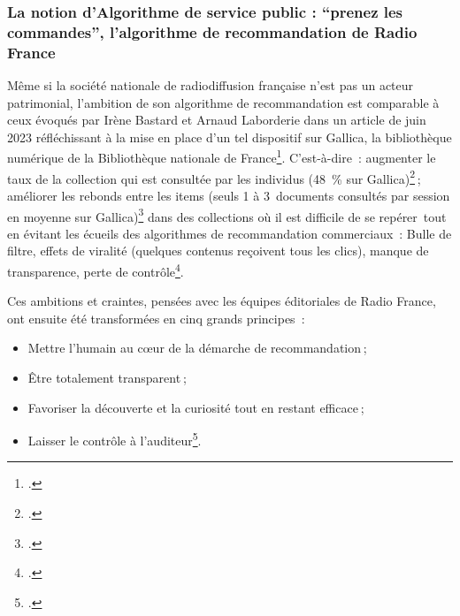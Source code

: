 \subsubsection{La notion d'Algorithme de service public : \enquote{prenez les commandes}, l'algorithme de recommandation de Radio France}

Même si la société nationale de radiodiffusion française n’est pas un acteur patrimonial, l’ambition de son algorithme de recommandation est comparable à ceux évoqués par Irène Bastard et Arnaud Laborderie dans un article de juin 2023 réfléchissant à la mise en place d’un tel dispositif sur Gallica, la bibliothèque numérique de la Bibliothèque nationale de France\footcite{bastard2023}. C’est-à-dire : augmenter le taux de la collection qui est consultée par les individus (48 \% sur Gallica)\footcite{bastard2023} ; améliorer les rebonds entre les items (seuls 1 à 3 documents consultés par session en moyenne sur Gallica)\footcite{bastard2023} dans des collections où il est difficile de se repérer tout en évitant les écueils des algorithmes de recommandation commerciaux : Bulle de filtre, effets de viralité (quelques contenus reçoivent tous les clics), manque de transparence, perte de contrôle\footcite{2023b}.

Ces ambitions et craintes, pensées avec les équipes éditoriales de Radio France, ont ensuite été transformées en cinq grands principes : 
\begin{itemize}
	\item Mettre l’humain au cœur de la démarche de recommandation ;
	\item Être totalement transparent ;
	\item Favoriser la découverte et la curiosité tout en restant efficace ;
	\item Laisser le contrôle à l’auditeur\footcite{2023b}.
\end{itemize}

